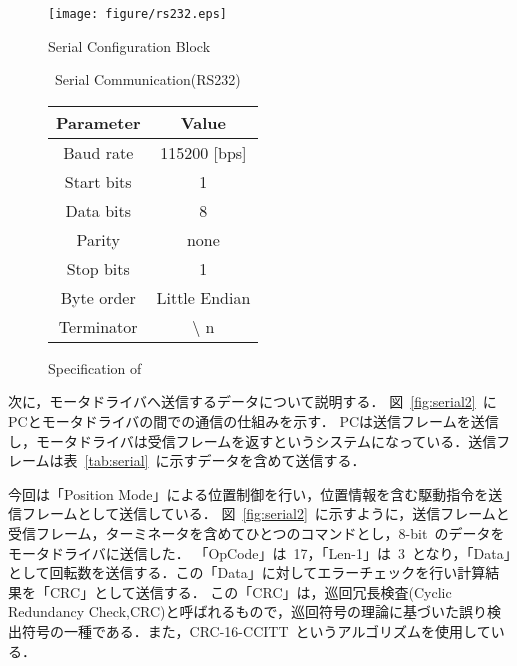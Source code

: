 \documentclass[a4paper,12pt]{article_vdlab_sotsuron}
\begin{document}
\vspace{10mm}
\begin{figure}[h]
  \begin{minipage}{0.55\hsize}
    \begin{center}
	\texttt{[image: figure/rs232.eps]}
      \vspace{3mm}
      \caption{Serial Configuration Block}
      \label{fig:rs}
      \end{center}
    \end{minipage}
  \begin{minipage}{0.4\hsize}
  \makeatletter
  \def\@captype{table}
  \makeatother
    \begin{center}
      \caption{Specification of}
      \ Serial Communication(RS232)
      \vspace*{3mm}
      \label{tab:Serial}
      \begin{tabular}{cc}\hline
	Parameter & Value \\\hline
	Baud rate & 115200 [bps] \\
	Start bits & 1 \\
	Data bits & 8 \\
	Parity & none \\
	Stop bits & 1\\
	Byte order & Little Endian\\
	Terminator & $\setminus$ n \\\hline
      \end{tabular}
    \end{center}
  \end{minipage}
\end{figure}





\newpage
次に，モータドライバへ送信するデータについて説明する．
図~\ref{fig:serial2}~にPCとモータドライバの間での通信の仕組みを示す．
PCは送信フレームを送信し，モータドライバは受信フレームを返すというシステムになっている．送信フレームは表~\ref{tab:serial}~に示すデータを含めて送信する．
\par
今回は「Position Mode」による位置制御を行い，位置情報を含む駆動指令を送信フレームとして送信している．
図~\ref{fig:serial2}~に示すように，送信フレームと受信フレーム，ターミネータを含めてひとつのコマンドとし，8-bit~のデータをモータドライバに送信した．
「OpCode」は~17，「Len-1」は~3~となり，「Data」として回転数を送信する．この「Data」に対してエラーチェックを行い計算結果を「CRC」として送信する．
この「CRC」は，巡回冗長検査(Cyclic Redundancy Check,CRC)と呼ばれるもので，巡回符号の理論に基づいた誤り検出符号の一種である．また，CRC-16-CCITT~というアルゴリズムを使用している．
\end{document}
